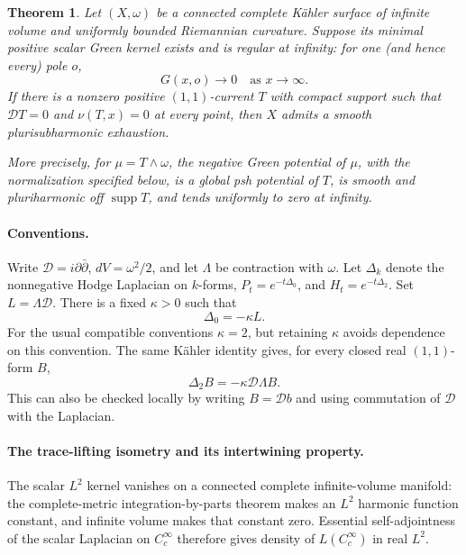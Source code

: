 \documentclass[11pt]{article}
\newtheorem{theorem}{Theorem}[section]
\theoremstyle{remark}
\newcommand{\D}{\mathcal D}
\newcommand{\supp}{\operatorname{supp}}
\begin{document}
\begin{theorem}\label{thm:green-separation}
Let $(X,\omega)$ be a connected complete K\"ahler surface of infinite
volume and uniformly bounded Riemannian curvature. Suppose its minimal positive scalar Green
kernel exists and is regular at infinity: for one (and hence every)
pole $o$,
\[
 G(x,o)\longrightarrow0\quad\text{as }x\to\infty.
\]
If there is a nonzero positive $(1,1)$-current $T$ with compact
support such that $\D T=0$ and $\nu(T,x)=0$ at every point, then
$X$ admits a smooth plurisubharmonic exhaustion.

More precisely, for $\mu=T\wedge\omega$, the negative Green
potential of $\mu$, with the normalization specified below, is a
global psh potential of $T$, is smooth and pluriharmonic off
$\supp T$, and tends uniformly to zero at infinity.
\end{theorem}

\paragraph{Conventions.}
Write $\D=i\partial\bar\partial$, $dV=\omega^2/2$, and let
$\Lambda$ be contraction with $\omega$. Let $\Delta_k$ denote the
nonnegative Hodge Laplacian on $k$-forms, $P_t=e^{-t\Delta_0}$, and
$H_t=e^{-t\Delta_2}$. Set $L=\Lambda\D$. There is a fixed
$\kappa>0$ such that
\begin{equation}\label{eq:normalization}
 \Delta_0=-\kappa L.
\end{equation}
For the usual compatible conventions $\kappa=2$, but retaining
$\kappa$ avoids dependence on this convention. The same K\"ahler
identity gives, for every closed real $(1,1)$-form $B$,
\begin{equation}\label{eq:closed-hodge}
 \Delta_2 B=-\kappa\D\Lambda B.
\end{equation}
This can also be checked locally by writing $B=\D b$ and using
commutation of $\D$ with the Laplacian.

\paragraph{The trace-lifting isometry and its intertwining property.}
The scalar $L^2$ kernel vanishes on a connected complete
infinite-volume manifold: the complete-metric integration-by-parts
theorem makes an $L^2$ harmonic function constant, and infinite
volume makes that constant zero. Essential self-adjointness of the
scalar Laplacian on $C_c^\infty$ therefore gives density of
$L(C_c^\infty)$ in real $L^2$.
\end{document}

